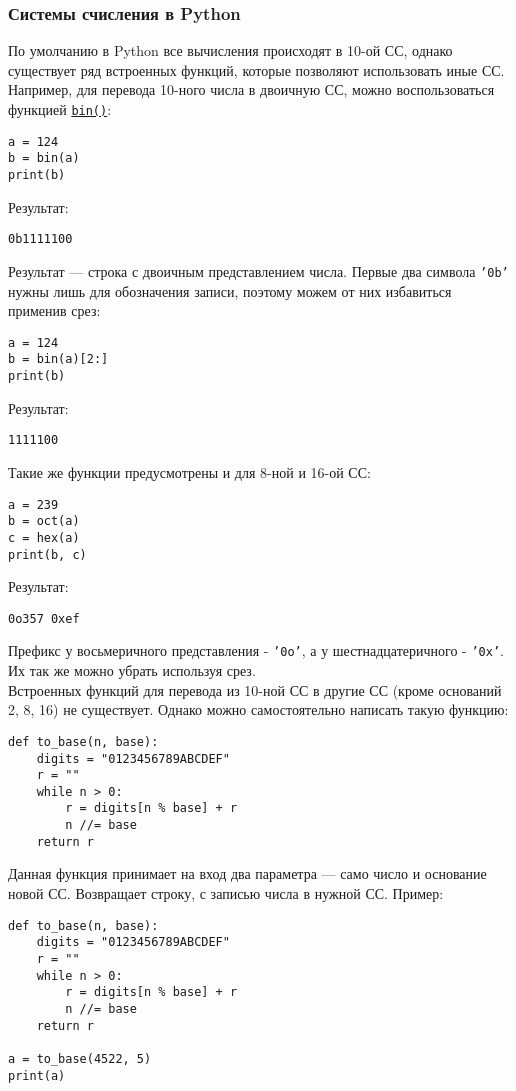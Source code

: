 \documentclass[12pt]{article}
\theoremstyle{problem_style}
\begin{document}
\subsubsection{Системы счисления в Python}
По умолчанию в Python все вычисления происходят в 10-ой СС, однако существует ряд встроенных функций, которые позволяют использовать иные СС.\\
Например, для перевода 10-ного числа в двоичную СС, можно воспользоваться функцией \href{https://docs.python.org/3/library/functions.html#bin}{\texttt{bin()}}:
\begin{verbatim}
a = 124
b = bin(a)
print(b)
\end{verbatim}
Результат:
\begin{verbatim}
0b1111100
\end{verbatim}
Результат — строка с двоичным представлением числа.
Первые два символа \texttt{'0b'} нужны лишь для обозначения записи, поэтому можем от них избавиться применив срез:
\begin{verbatim}
a = 124
b = bin(a)[2:]
print(b)
\end{verbatim}
Результат:
\begin{verbatim}
1111100
\end{verbatim}
Такие же функции предусмотрены и для 8-ной и 16-ой СС:
\begin{verbatim}
a = 239
b = oct(a)
c = hex(a)
print(b, c)
\end{verbatim}
Результат:
\begin{verbatim}
0o357 0xef
\end{verbatim}
Префикс у восьмеричного представления - \texttt{'0o'}, а у шестнадцатеричного - \texttt{'0x'}. Их так же можно убрать используя срез.\\
Встроенных функций для перевода из 10-ной СС в другие СС (кроме оснований 2, 8, 16) не существует. Однако можно самостоятельно написать такую функцию:
\begin{verbatim}
def to_base(n, base):
    digits = "0123456789ABCDEF"
    r = ""
    while n > 0:
        r = digits[n % base] + r
        n //= base
    return r
\end{verbatim}
Данная функция принимает на вход два параметра — само число и основание новой СС. Возвращает строку, с записью числа в нужной СС. Пример:
\begin{verbatim}
def to_base(n, base):
    digits = "0123456789ABCDEF"
    r = ""
    while n > 0:
        r = digits[n % base] + r
        n //= base
    return r

a = to_base(4522, 5)
print(a)
\end{verbatim}
\end{document}
